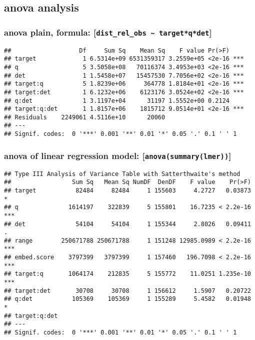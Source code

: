 \documentclass[
]{article}
\begin{document}
\subsection{anova analysis}\label{anova-analysis}

\subsubsection{\texorpdfstring{anova plain, formula: {[}\texttt{dist\_rel\_obs\ \textasciitilde{}\ target*q*det}{]}}{anova plain, formula: {[}dist\_rel\_obs \textasciitilde{} target*q*det{]}}}\label{anova-plain-formula-dist_rel_obs-targetqdet}

\begin{verbatim}
##                   Df     Sum Sq    Mean Sq    F value Pr(>F)    
## target             1 6.5314e+09 6531359317 3.2559e+05 <2e-16 ***
## q                  5 3.5058e+08   70116374 3.4953e+03 <2e-16 ***
## det                1 1.5458e+07   15457530 7.7056e+02 <2e-16 ***
## target:q           5 1.8239e+06     364778 1.8184e+01 <2e-16 ***
## target:det         1 6.1232e+06    6123176 3.0524e+02 <2e-16 ***
## q:det              1 3.1197e+04      31197 1.5552e+00 0.2124    
## target:q:det       1 1.8157e+06    1815712 9.0514e+01 <2e-16 ***
## Residuals    2249061 4.5116e+10      20060                      
## ---
## Signif. codes:  0 '***' 0.001 '**' 0.01 '*' 0.05 '.' 0.1 ' ' 1
\end{verbatim}

\subsubsection{\texorpdfstring{anova of linear regression model: {[}\texttt{anova(summary(lmer))}{]}}{anova of linear regression model: {[}anova(summary(lmer)){]}}}\label{anova-of-linear-regression-model-anovasummarylmer}

\begin{verbatim}
## Type III Analysis of Variance Table with Satterthwaite's method
##                 Sum Sq   Mean Sq NumDF  DenDF    F value    Pr(>F)    
## target           82484     82484     1 155603     4.2727   0.03873 *  
## q              1614197    322839     5 155801    16.7235 < 2.2e-16 ***
## det              54104     54104     1 155344     2.8026   0.09411 .  
## range        250671788 250671788     1 151248 12985.0989 < 2.2e-16 ***
## embed.score    3797399   3797399     1 157460   196.7098 < 2.2e-16 ***
## target:q       1064174    212835     5 155772    11.0251 1.235e-10 ***
## target:det       30708     30708     1 156612     1.5907   0.20722    
## q:det           105369    105369     1 155289     5.4582   0.01948 *  
## target:q:det                                                          
## ---
## Signif. codes:  0 '***' 0.001 '**' 0.01 '*' 0.05 '.' 0.1 ' ' 1
\end{verbatim}
\end{document}
